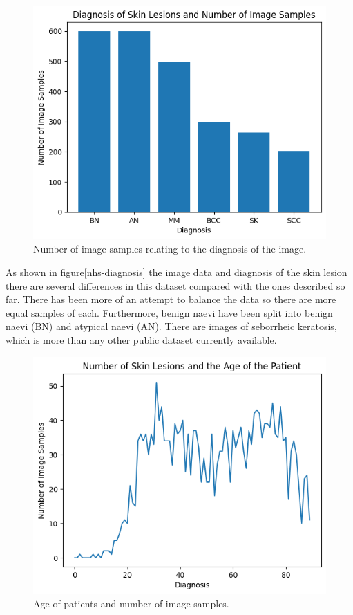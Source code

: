 \begin{figure}
    \centering
    \includegraphics[scale=0.75]{images/nhs/nhs-diagnosis.png}
    \caption{Number of image samples relating to the diagnosis of the image.} 
\end{figure}\label{nhs-diagnosis}

 As shown in figure\ref{nhs-diagnosis} the image data and diagnosis of the skin lesion there are several differences in this dataset compared with the ones described so far. There has been more of an attempt to balance the data so there are more equal samples of each. Furthermore, benign naevi have been split into benign naevi (BN) and atypical naevi (AN). There are images of seborrheic keratosis, which is more than any other public dataset currently available. 

 \begin{figure}
    \centering
    \includegraphics[scale=0.75]{images/nhs/nhs-age.png}
    \caption{Age of patients and number of image samples.} 
\end{figure}\label{nhs-age}

